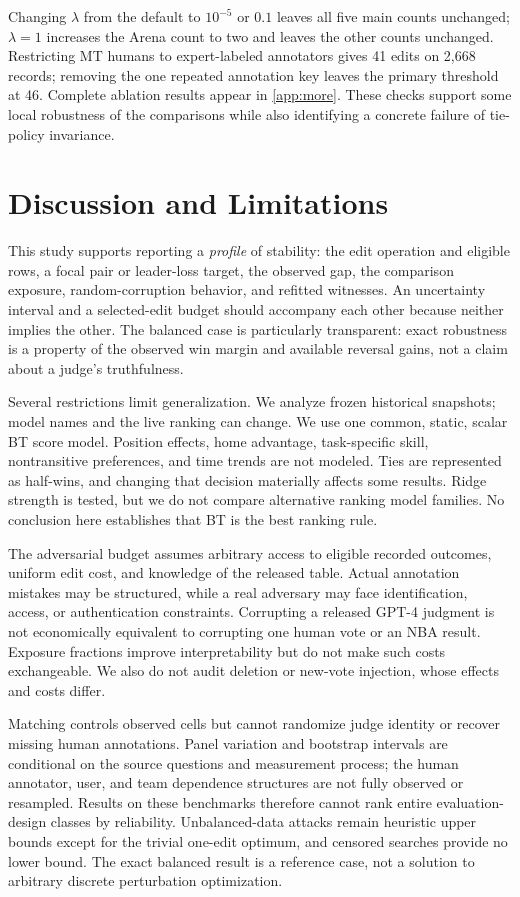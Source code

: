 \documentclass{article}
\begin{document}
Changing $\lambda$ from the default to $10^{-5}$ or $0.1$ leaves all five main counts unchanged; $\lambda=1$ increases the Arena count to two and leaves the other counts unchanged. Restricting MT humans to expert-labeled annotators gives 41 edits on 2,668 records; removing the one repeated annotation key leaves the primary threshold at 46. Complete ablation results appear in \cref{app:more}. These checks support some local robustness of the comparisons while also identifying a concrete failure of tie-policy invariance.

\section{Discussion and Limitations}
This study supports reporting a \emph{profile} of stability: the edit operation and eligible rows, a focal pair or leader-loss target, the observed gap, the comparison exposure, random-corruption behavior, and refitted witnesses. An uncertainty interval and a selected-edit budget should accompany each other because neither implies the other. The balanced case is particularly transparent: exact robustness is a property of the observed win margin and available reversal gains, not a claim about a judge's truthfulness.

Several restrictions limit generalization. We analyze frozen historical snapshots; model names and the live ranking can change. We use one common, static, scalar BT score model. Position effects, home advantage, task-specific skill, nontransitive preferences, and time trends are not modeled. Ties are represented as half-wins, and changing that decision materially affects some results. Ridge strength is tested, but we do not compare alternative ranking model families. No conclusion here establishes that BT is the best ranking rule.

The adversarial budget assumes arbitrary access to eligible recorded outcomes, uniform edit cost, and knowledge of the released table. Actual annotation mistakes may be structured, while a real adversary may face identification, access, or authentication constraints. Corrupting a released GPT-4 judgment is not economically equivalent to corrupting one human vote or an NBA result. Exposure fractions improve interpretability but do not make such costs exchangeable. We also do not audit deletion or new-vote injection, whose effects and costs differ.

Matching controls observed cells but cannot randomize judge identity or recover missing human annotations. Panel variation and bootstrap intervals are conditional on the source questions and measurement process; the human annotator, user, and team dependence structures are not fully observed or resampled. Results on these benchmarks therefore cannot rank entire evaluation-design classes by reliability. Unbalanced-data attacks remain heuristic upper bounds except for the trivial one-edit optimum, and censored searches provide no lower bound. The exact balanced result is a reference case, not a solution to arbitrary discrete perturbation optimization.
\end{document}
